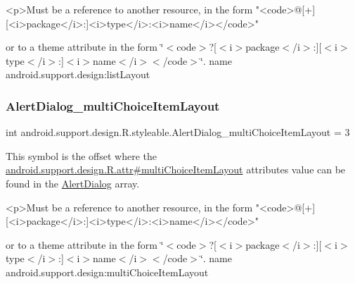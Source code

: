 \begin{DoxyVerb}      <p>Must be a reference to another resource, in the form "<code>@[+][<i>package</i>:]<i>type</i>:<i>name</i></code>"
\end{DoxyVerb}
 or to a theme attribute in the form \char`\"{}$<$code$>$?\mbox{[}$<$i$>$package$<$/i$>$\+:\mbox{]}\mbox{[}$<$i$>$type$<$/i$>$\+:\mbox{]}$<$i$>$name$<$/i$>$$<$/code$>$\char`\"{}.  name android.\+support.\+design\+:list\+Layout \mbox{\label{classandroid_1_1support_1_1design_1_1R_1_1styleable_a34d96148dd7a784337c42ef3b86ce153}} 
\subsubsection{\texorpdfstring{Alert\+Dialog\+\_\+multi\+Choice\+Item\+Layout}{AlertDialog\_multiChoiceItemLayout}}
{\footnotesize\ttfamily int android.\+support.\+design.\+R.\+styleable.\+Alert\+Dialog\+\_\+multi\+Choice\+Item\+Layout = 3\hspace{0.3cm}{\ttfamily [static]}}

This symbol is the offset where the \hyperlink{classandroid_1_1support_1_1design_1_1R_1_1attr_a52df08b0a39a788dc12dab79f50da855}{android.\+support.\+design.\+R.\+attr\#multi\+Choice\+Item\+Layout} attribute\textquotesingle{}s value can be found in the \hyperlink{classandroid_1_1support_1_1design_1_1R_1_1styleable_aeccb758d25f6e242e6f3a23f3873ec21}{Alert\+Dialog} array.

\begin{DoxyVerb}      <p>Must be a reference to another resource, in the form "<code>@[+][<i>package</i>:]<i>type</i>:<i>name</i></code>"
\end{DoxyVerb}
 or to a theme attribute in the form \char`\"{}$<$code$>$?\mbox{[}$<$i$>$package$<$/i$>$\+:\mbox{]}\mbox{[}$<$i$>$type$<$/i$>$\+:\mbox{]}$<$i$>$name$<$/i$>$$<$/code$>$\char`\"{}.  name android.\+support.\+design\+:multi\+Choice\+Item\+Layout \mbox{\label{classandroid_1_1support_1_1design_1_1R_1_1styleable_ae17be3e7b2e63e091946463a9e26a522}} 
